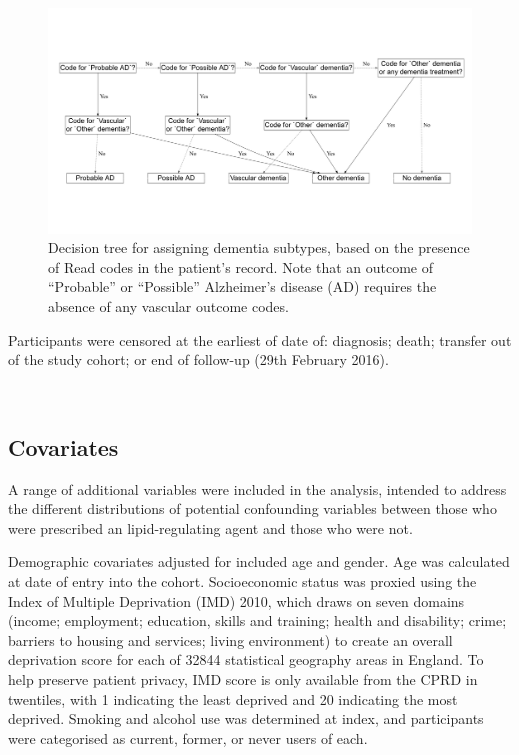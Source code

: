 \documentclass[a4paper, twoside]{templates/ociamthesis}
\begin{document}
\begin{figure}[H]
\includegraphics[width=1\linewidth]{figures/cprd-analysis/decision_tree} \caption[Decision tree for assigning dementia subtypes]{Decision tree for assigning dementia subtypes, based on the presence of Read codes in the patient's record. Note that an outcome of ``Probable'' or ``Possible'' Alzheimer's disease (AD) requires the absence of any vascular outcome codes.}\label{fig:decisionTreeFig}
\end{figure}

Participants were censored at the earliest of date of: diagnosis; death; transfer out of the study cohort; or end of follow-up (29th February 2016).

~

\hypertarget{covariates}{%
\subsection{Covariates}\label{covariates}}

A range of additional variables were included in the analysis, intended to address the different distributions of potential confounding variables between those who were prescribed an lipid-regulating agent and those who were not.

Demographic covariates adjusted for included age and gender. Age was calculated at date of entry into the cohort. Socioeconomic status was proxied using the Index of Multiple Deprivation (IMD) 2010, which draws on seven domains (income; employment; education, skills and training; health and disability; crime; barriers to housing and services; living environment) to create an overall deprivation score for each of 32844 statistical geography areas in England. To help preserve patient privacy, IMD score is only available from the CPRD in twentiles, with 1 indicating the least deprived and 20 indicating the most deprived. Smoking and alcohol use was determined at index, and participants were categorised as current, former, or never users of each.
\end{document}
